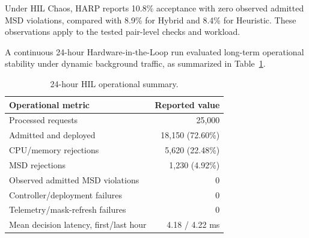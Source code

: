 \documentclass[final,5p]{elsarticle}
\newcommand{\rev}[1]{\textcolor{BrickRed}{#1}}
\begin{document}
\begin{table}[!tb]
\centering
\caption{\rev{HIL admission / admitted MSD-violation rates (\%; mean across $N=10$ independent runs). Denominators within each run are offered / admitted requests, respectively; Greedy and DAI are unprotected.}}
\label{tab:testbed_results}
\renewcommand{\arraystretch}{1.08}
\setlength{\tabcolsep}{2pt}
\small
{}
\end{table}

\rev{Under HIL Chaos, HARP reports 10.8\% acceptance with zero observed admitted MSD violations, compared with 8.9\% for Hybrid and 8.4\% for Heuristic. These observations apply to the tested pair-level checks and workload.}

\rev{A continuous 24-hour Hardware-in-the-Loop run evaluated long-term operational stability under dynamic background traffic, as summarized in Table~\ref{tab:hil_24h_stability}.}

\begin{table}[!tb]
\centering
\caption{\rev{24-hour HIL operational summary}.}
\label{tab:hil_24h_stability}
\renewcommand{\arraystretch}{1.10}
\small
\begin{tabularx}{\linewidth}{>{\raggedright\arraybackslash}Xr}
\toprule
\textbf{Operational metric} & \textbf{Reported value} \\
\midrule
Processed requests & 25,000 \\
Admitted and deployed & 18,150 (72.60\%) \\
CPU/memory rejections & 5,620 (22.48\%) \\
MSD rejections & 1,230 (4.92\%) \\
Observed admitted MSD violations & 0 \\
Controller/deployment failures & 0 \\
Telemetry/mask-refresh failures & 0 \\
Mean decision latency, first/last hour & 4.18 / 4.22 ms \\
\bottomrule
\end{tabularx}
\end{table}
\end{document}
